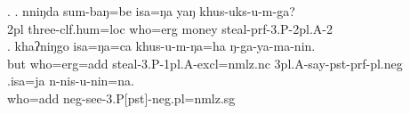 \ex. \ag. nniŋda  sum-baŋ=be          isa=ŋa   yaŋ  khus-uks-u-m-ga?\\
 	{\sc 2pl} three{\sc -clf.hum=loc} who{\sc =erg} money steal{\sc [pst]-prf-3.P-2pl.A-2}\\
 	\bg. khaʔniŋgo isa=ŋa=ca      khus-u-m-ŋa=ha ŋ-ga-ya-ma-nin.\\
 	but who{\sc =erg=add} steal{\sc [pst]-3.P-1pl.A-excl=nmlz.nc} {\sc 3pl.A-}say{\sc -pst-prf-pl.neg}\\
 	 
\bg.isa=ja n-nis-u-nin=na.\\
who{\sc =add} {\sc neg-}see{\sc -3.P[pst]-neg.pl=nmlz.sg}\\
 







